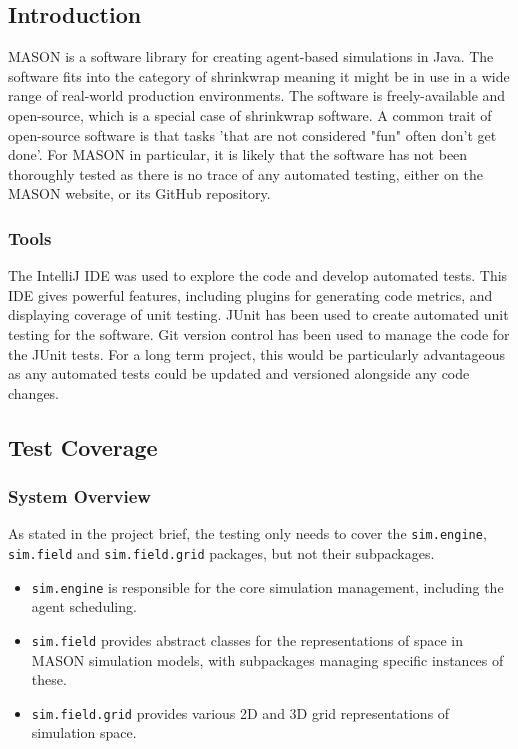 \documentclass[11pt]{article}
\begin{document}
\subsection{Introduction}
MASON is a software library for creating agent-based simulations in Java. 
The software fits into the category of shrinkwrap meaning it might be in use in a wide range of real-world production environments. The software is freely-available and open-source, which is a special case of shrinkwrap software. A common trait of open-source software is that tasks 'that are not considered "fun" often don't get done'.\cite{five_worlds}
For MASON in particular, it is likely that the software has not been thoroughly tested as there is no trace of any automated testing, either on the MASON website, or its GitHub repository.


\subsubsection{Tools}
The IntelliJ IDE was used to explore the code and develop automated tests. This IDE gives powerful features, including plugins for generating code metrics, and displaying coverage of unit testing.
JUnit has been used to create automated unit testing for the software.
Git version control has been used to manage the code for the JUnit tests. For a long term project, this would be particularly advantageous as any automated tests could be updated and versioned alongside any code changes.

\subsection{Test Coverage}
\subsubsection{System Overview}
As stated in the project brief, the testing only needs to cover the \texttt{sim.engine}, \texttt{sim.field} and \texttt{sim.field.grid} packages, but not their subpackages.
\begin{itemize}
\item \texttt{sim.engine} is responsible for the core simulation management, including the agent scheduling.
\item \texttt{sim.field} provides abstract classes for the representations of space in MASON simulation models, with subpackages managing specific instances of these.
\item \texttt{sim.field.grid} provides various 2D and 3D grid representations of simulation space.
\end{itemize}
\end{document}
